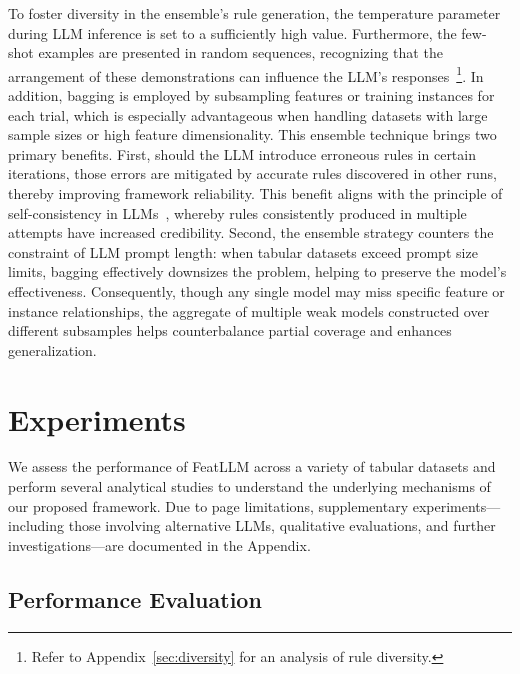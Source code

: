 To foster diversity in the ensemble’s rule generation, the temperature parameter during LLM inference is set to a sufficiently high value. Furthermore, the few-shot examples are presented in random sequences, recognizing that the arrangement of these demonstrations can influence the LLM’s responses~\cite{lu2022fantastically}\footnote{Refer to Appendix~\ref{sec:diversity} for an analysis of rule diversity.}. In addition, bagging is employed by subsampling features or training instances for each trial, which is especially advantageous when handling datasets with large sample sizes or high feature dimensionality. This ensemble technique brings two primary benefits. First, should the LLM introduce erroneous rules in certain iterations, those errors are mitigated by accurate rules discovered in other runs, thereby improving framework reliability. This benefit aligns with the principle of self-consistency in LLMs~\cite{wang2022self}, whereby rules consistently produced in multiple attempts have increased credibility. Second, the ensemble strategy counters the constraint of LLM prompt length: when tabular datasets exceed prompt size limits, bagging effectively downsizes the problem, helping to preserve the model’s effectiveness. Consequently, though any single model may miss specific feature or instance relationships, the aggregate of multiple weak models constructed over different subsamples helps counterbalance partial coverage and enhances generalization.

\section{Experiments}
We assess the performance of \textsf{FeatLLM} across a variety of tabular datasets and perform several analytical studies to understand the underlying mechanisms of our proposed framework. Due to page limitations, supplementary experiments—including those involving alternative LLMs, qualitative evaluations, and further investigations—are documented in the Appendix.

\subsection{Performance Evaluation}
